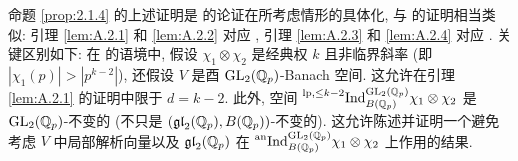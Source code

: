 \begin{remark}\label{rem:A.2.5}
命题 \ref{prop:2.1.4} 的上述证明是 \cite{ref:25} 的论证在所考虑情形的具体化, 与 \cite[Prop.~2.5]{ref:21} 的证明相当类似: 引理 \ref{lem:A.2.1} 和 \ref{lem:A.2.2} 对应 \cite[Lem.~3.23]{ref:21}, 引理 \ref{lem:A.2.3} 和 \ref{lem:A.2.4} 对应 \cite[Lem.~3.1]{ref:21}.
关键区别如下: 在 \cite[Prop.~2.5]{ref:21} 的语境中, 假设 $\chi_1 \otimes \chi_2$ 是经典权 $k$ 且非临界斜率 (即 $|\chi_1(p)| > |p^{k-2}|$), 还假设 $V$ 是酉 $\mathrm{GL}_2(\mathbb{Q}_p)$-Banach 空间.
这允许在引理 \ref{lem:A.2.1} 的证明中限于 $d = k-2$.
此外, 空间 $\prescript{\mathrm{lp},\le k-2}{}{\mathrm{Ind}}_{B(\mathbb{Q}_p)}^{\mathrm{GL}_2(\mathbb{Q}_p)} \chi_1 \otimes \chi_2$ 是 $\mathrm{GL}_2(\mathbb{Q}_p)$-不变的 (不只是 $(\mathfrak{gl}_2(\mathbb{Q}_p),B(\mathbb{Q}_p))$-不变的).
这允许陈述并证明一个避免考虑 $V$ 中局部解析向量以及 $\mathfrak{gl}_2(\mathbb{Q}_p)$ 在 $\prescript{\mathrm{an}}{}{\mathrm{Ind}}_{B(\mathbb{Q}_p)}^{\mathrm{GL}_2(\mathbb{Q}_p)} \chi_1 \otimes \chi_2$ 上作用的结果.
\end{remark}
